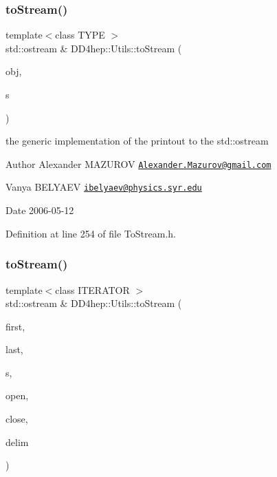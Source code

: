\subsubsection{\texorpdfstring{to\+Stream()}{toStream()}\hspace{0.1cm}{\footnotesize\ttfamily [1/22]}}
{\footnotesize\ttfamily template$<$class T\+Y\+PE $>$ \\
std\+::ostream \& D\+D4hep\+::\+Utils\+::to\+Stream (\begin{DoxyParamCaption}\item[{const T\+Y\+PE \&}]{obj,  }\item[{std\+::ostream \&}]{s }\end{DoxyParamCaption})\hspace{0.3cm}{\ttfamily [inline]}}

the generic implementation of the printout to the std\+::ostream \begin{DoxyAuthor}{Author}
Alexander M\+A\+Z\+U\+R\+OV \href{mailto:Alexander.Mazurov@gmail.com}{\tt Alexander.\+Mazurov@gmail.\+com} 

Vanya B\+E\+L\+Y\+A\+EV \href{mailto:ibelyaev@physics.syr.edu}{\tt ibelyaev@physics.\+syr.\+edu} 
\end{DoxyAuthor}
\begin{DoxyDate}{Date}
2006-\/05-\/12 
\end{DoxyDate}


Definition at line 254 of file To\+Stream.\+h.

\hypertarget{namespace_d_d4hep_1_1_utils_acf5ffb31569b70cc4e4b347b5f8d858f}{}\label{namespace_d_d4hep_1_1_utils_acf5ffb31569b70cc4e4b347b5f8d858f} 
\subsubsection{\texorpdfstring{to\+Stream()}{toStream()}\hspace{0.1cm}{\footnotesize\ttfamily [2/22]}}
{\footnotesize\ttfamily template$<$class I\+T\+E\+R\+A\+T\+OR $>$ \\
std\+::ostream \& D\+D4hep\+::\+Utils\+::to\+Stream (\begin{DoxyParamCaption}\item[{I\+T\+E\+R\+A\+T\+OR}]{first,  }\item[{I\+T\+E\+R\+A\+T\+OR}]{last,  }\item[{std\+::ostream \&}]{s,  }\item[{const std\+::string \&}]{open,  }\item[{const std\+::string \&}]{close,  }\item[{const std\+::string \&}]{delim }\end{DoxyParamCaption})\hspace{0.3cm}{\ttfamily [inline]}}



